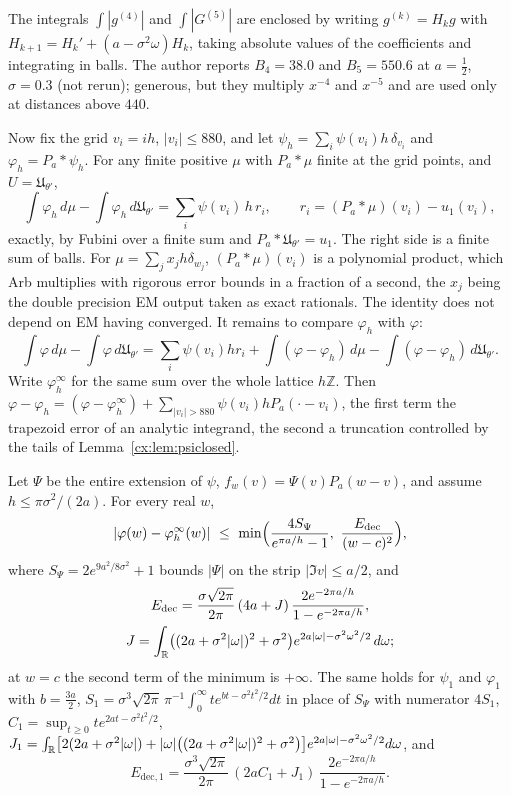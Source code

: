 The integrals $\int|g^{(4)}|$ and $\int|G^{(5)}|$ are enclosed by writing $g^{(k)}=H_kg$ with $H_{k+1}=H_k'+(a-\sigma^2\omega)H_k$, taking absolute values of the coefficients and integrating in balls. The author reports $B_4=38.0$ and $B_5=550.6$ at $a=\tfrac12$, $\sigma=0.3$ (not rerun); generous, but they multiply $x^{-4}$ and $x^{-5}$ and are used only at distances above $440$.

Now fix the grid $v_i=ih$, $|v_i|\le880$, and let $\psi_h=\sum_i\psi(v_i)h\,\delta_{v_i}$ and $\varphi_h=P_a*\psi_h$. For any finite positive $\mu$ with $P_a*\mu$ finite at the grid points, and $U=\mathfrak U_{\theta'}$,
\begin{equation}\label{cx:eq:exactid}
\int\varphi_h\,d\mu-\int\varphi_h\,d\mathfrak U_{\theta'}=\sum_i\psi(v_i)\,h\,r_i,\qquad r_i=(P_a*\mu)(v_i)-u_1(v_i),
\end{equation}
exactly, by Fubini over a finite sum and $P_a*\mathfrak U_{\theta'}=u_1$. The right side is a finite sum of balls. For $\mu=\sum_jx_jh\delta_{w_j}$, $(P_a*\mu)(v_i)$ is a polynomial product, which Arb \cite{Arb} multiplies with rigorous error bounds in a fraction of a second, the $x_j$ being the double precision EM output taken as exact rationals. The identity does not depend on EM having converged. It remains to compare $\varphi_h$ with $\varphi$:
\[
\int\varphi\,d\mu-\int\varphi\,d\mathfrak U_{\theta'}=\sum_i\psi(v_i)hr_i+\int(\varphi-\varphi_h)\,d\mu-\int(\varphi-\varphi_h)\,d\mathfrak U_{\theta'} .
\]
Write $\varphi_h^\infty$ for the same sum over the whole lattice $h\mathbb Z$. Then $\varphi-\varphi_h=(\varphi-\varphi_h^\infty)+\sum_{|v_i|>880}\psi(v_i)hP_a(\cdot-v_i)$, the first term the trapezoid error of an analytic integrand, the second a truncation controlled by the tails of Lemma~\ref{cx:lem:psiclosed}.

\begin{lemma}\label{cx:lem:trap}
Let $\Psi$ be the entire extension of $\psi$, $f_w(v)=\Psi(v)P_a(w-v)$, and assume $h\le\pi\sigma^2/(2a)$. For every real $w$,
\[
|\varphi(w)-\varphi_h^\infty(w)|\ \le\ \min\Bigl(\frac{4S_\Psi}{e^{\pi a/h}-1},\ \frac{E_{\mathrm{dec}}}{(w-c)^2}\Bigr),
\]
where $S_\Psi=2e^{9a^2/8\sigma^2}+1$ bounds $|\Psi|$ on the strip $|\Im v|\le a/2$, and
\begin{gather*}
E_{\mathrm{dec}}=\frac{\sigma\sqrt{2\pi}}{2\pi}\,(4a+J)\,\frac{2e^{-2\pi a/h}}{1-e^{-2\pi a/h}},\\
J=\int_{\mathbb{R}}\bigl((2a+\sigma^2|\omega|)^2+\sigma^2\bigr)e^{2a|\omega|-\sigma^2\omega^2/2}\,d\omega ;
\end{gather*}
at $w=c$ the second term of the minimum is $+\infty$. The same holds for $\psi_1$ and $\varphi_1$ with $b=\tfrac{3a}2$, $S_1=\sigma^3\sqrt{2\pi}\,\pi^{-1}\int_0^\infty te^{bt-\sigma^2t^2/2}dt$ in place of $S_\Psi$ with numerator $4S_1$, $C_1=\sup_{t\ge0}te^{2at-\sigma^2t^2/2}$, $J_1=\int_{\mathbb{R}}\bigl[2(2a+\sigma^2|\omega|)+|\omega|\bigl((2a+\sigma^2|\omega|)^2+\sigma^2\bigr)\bigr]e^{2a|\omega|-\sigma^2\omega^2/2}d\omega$, and
\[
E_{\mathrm{dec},1}=\frac{\sigma^3\sqrt{2\pi}}{2\pi}\,(2aC_1+J_1)\,\frac{2e^{-2\pi a/h}}{1-e^{-2\pi a/h}} .
\]
\end{lemma}

